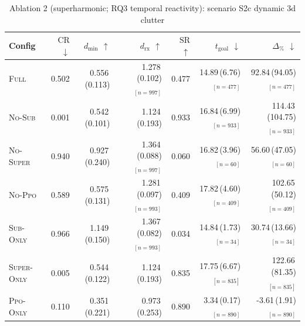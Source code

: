 \begin{table}[h]
\centering
\small
\caption{Ablation 2 (superharmonic; RQ3 temporal reactivity): scenario S2c dynamic 3d clutter}
\label{tab:abl2:S2c_dynamic_3d_clutter}
\begin{tabular}{lrrrrrr}
\toprule
Config & $\mathrm{CR}$ $\downarrow$ & $d_{\min}$ $\uparrow$ & $d_{\mathrm{rx}}$ $\uparrow$ & $\mathrm{SR}$ $\uparrow$ & $t_{\mathrm{goal}}$ $\downarrow$ & $\Delta_{\%}$ $\downarrow$ \\
\midrule
\textsc{Full} & 0.502 & 0.556\,(0.113) & 1.278\,(0.102)$_{[n=997]}$ & 0.477 & 14.89\,(6.76)$_{[n=477]}$ & 92.84\,(94.05)$_{[n=477]}$ \\
\textsc{No-Sub} & 0.001 & 0.542\,(0.101) & 1.124\,(0.193) & 0.933 & 16.84\,(6.99)$_{[n=933]}$ & 114.43\,(104.75)$_{[n=933]}$ \\
\textsc{No-Super} & 0.940 & 0.927\,(0.240) & 1.364\,(0.088)$_{[n=997]}$ & 0.060 & 16.82\,(3.96)$_{[n=60]}$ & 56.60\,(47.05)$_{[n=60]}$ \\
\textsc{No-Ppo} & 0.589 & 0.575\,(0.131) & 1.281\,(0.097)$_{[n=993]}$ & 0.409 & 17.82\,(4.60)$_{[n=409]}$ & 102.65\,(50.12)$_{[n=409]}$ \\
\textsc{Sub-Only} & 0.966 & 1.149\,(0.150) & 1.367\,(0.082)$_{[n=993]}$ & 0.034 & 14.84\,(1.73)$_{[n=34]}$ & 30.74\,(13.66)$_{[n=34]}$ \\
\textsc{Super-Only} & 0.005 & 0.544\,(0.122) & 1.124\,(0.193) & 0.835 & 17.75\,(6.67)$_{[n=835]}$ & 122.66\,(81.35)$_{[n=835]}$ \\
\textsc{Ppo-Only} & 0.110 & 0.351\,(0.221) & 0.973\,(0.253) & 0.890 & 3.34\,(0.17)$_{[n=890]}$ & -3.61\,(1.91)$_{[n=890]}$ \\
\bottomrule
\end{tabular}
\end{table}
